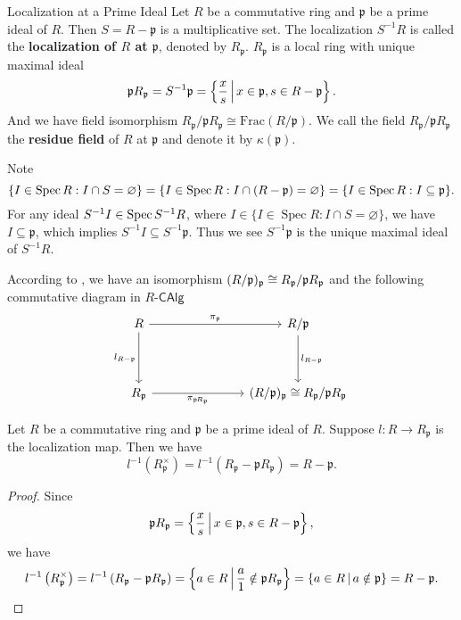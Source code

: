 \begin{definition}{Localization at a Prime Ideal}{}
    Let $R$ be a commutative ring and $\mathfrak{p}$ be a prime ideal of $R$. Then $S=R-\mathfrak{p}$ is a multiplicative set. The localization $S^{-1}R$ is called the \textbf{localization of $R$ at $\mathfrak{p}$}, denoted by $R_\mathfrak{p}$. $R_\mathfrak{p}$ is a local ring with unique maximal ideal 
    \[
    \mathfrak{p}R_\mathfrak{p}=S^{-1}\mathfrak{p}=\left\{\frac{x}{s}\,\middle\vert\, x\in \mathfrak{p}, s\in R-\mathfrak{p}\right\}.
    \]
    And we have field isomorphism $R_\mathfrak{p}/\mathfrak{p}R_\mathfrak{p}\cong \mathrm{Frac}(R/\mathfrak{p})$. We call the field $R_\mathfrak{p}/\mathfrak{p}R_\mathfrak{p}$ the \textbf{residue field} of $R$ at $\mathfrak{p}$ and denote it by $\kappa(\mathfrak{p})$.
\end{definition}

\begin{prf}
    Note
    \[
        \{I \in \operatorname{Spec} R: I \cap S=\varnothing\}=\{I \in \operatorname{Spec} R: I \cap (R-\frak{p})=\varnothing\}=\{I \in \operatorname{Spec} R: I\subseteq \frak{p}\}.
    \]
    For any ideal $S^{-1}I \in \operatorname{Spec} S^{-1}R$, where
    $I\in  \{I \in \operatorname{Spec} R: I \cap S=\varnothing\}$, we have $I\subseteq \mathfrak{p}$, which implies $S^{-1}I\subseteq  S^{-1}\mathfrak{p}$. Thus we see $S^{-1}\mathfrak{p}$ is the unique maximal ideal of $S^{-1}R$. 
    
    According to , we have an isomorphism $(R/\frak{p})_{\frak{p}}\cong R_\frak{p}/\frak{p}R_\frak{p}$ and the following commutative diagram in $R\text{-}\mathsf{CAlg}$ 
    \[
        \begin{tikzcd}
            R \arrow[r, "\pi_\mathfrak{p}"] \arrow[d, "l_{R-\mathfrak{p}}"'] &[+5em] R/\mathfrak{p} \arrow[d, "l_{R-\mathfrak{p}}"]              \\[+2em]
            R_\mathfrak{p} \arrow[r, "\pi_{\mathfrak{p}\hspace{-1pt}R_\mathfrak{p}}"']       & (R/\mathfrak{p})_\mathfrak{p}\cong R_\mathfrak{p}/\mathfrak{p} R_\mathfrak{p}
            \end{tikzcd}
    \]
\end{prf}

\begin{lemma}{}{}
    Let $R$ be a commutative ring and $\mathfrak{p}$ be a prime ideal of $R$. Suppose $l:R\to R_\mathfrak{p}$ is the localization map. Then we have
    \[
    l^{-1}\left(R_\mathfrak{p}^{\times}\right)=l^{-1}\left(R_\mathfrak{p}-\mathfrak{p} R_\mathfrak{p}\right)=R-\mathfrak{p}.
    \]
\end{lemma}
\begin{proof}
    Since \[
    \mathfrak{p}R_\mathfrak{p}=\left\{\frac{x}{s}\,\middle\vert\, x\in \mathfrak{p}, s\in R-\mathfrak{p}\right\},
    \]
    we have
    \[
    l^{-1}\left(R_\mathfrak{p}^{\times}\right)=l^{-1}\left(R_\mathfrak{p}-\mathfrak{p} R_\mathfrak{p}\right)=\left\{a\in R \,\middle\vert\, \frac{a}{1}\notin \mathfrak{p}R_\mathfrak{p}\right\}=\left\{a\in R\,\middle\vert\, a\notin \mathfrak{p}\right\}=R-\mathfrak{p}.
    \]
\end{proof}

